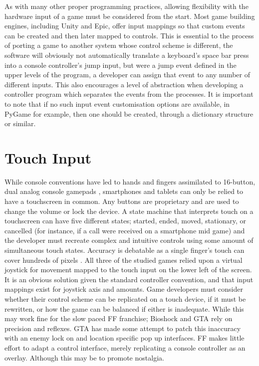 \documentclass{scrartcl}
\begin{document}
As with many other proper programming practices, allowing flexibility with the hardware input of a game must be considered from the start.  Most game building engines, including Unity and Epic, offer input mappings so that custom events can be created and then later mapped to controls.  This is essential 
to the process of porting a game to another system whose control scheme is different, the software will obviously not automatically translate a keyboard's space bar 
press into a console controller's jump input, but were a jump event defined in the upper levels of the program, a developer can assign that event to any number of different inputs.  This also encourages a level of abstraction when developing a controller program which separates the events from the processes.  It is important to note that if no such input event customisation options are available, in PyGame for example, then one should be created, through a dictionary structure or similar.

\section*{Touch Input}

While console conventions have led to hands and fingers assimilated to 16-button, dual analog console gamepads \cite{parisi2015counterrevolution}, smartphones and tablets can only be relied to have a touchscreen in common.  Any buttons are proprietary and are used to change the volume or lock the device.  A state machine that interprets touch on a touchscreen can have five different states; started, ended, moved, stationary, or cancelled (for instance, if a call were received on a smartphone mid game) and the developer must recreate complex and intuitive controls using some amount of simultaneous touch states.  Accuracy is debatable as a single finger's touch can cover hundreds of pixels \cite{schmidt2010phonetouch}.  All three of the studied games relied upon a virtual joystick for movement mapped to the touch input on the lower left of the screen.  It is an obvious solution given the standard controller convention, and that input mappings exist for joystick axis and amounts.  Game developers must consider whether their control scheme can be replicated on a touch device, if it must be rewritten, or how the game can be balanced if either is inadequate.  While this may work fine for the slow paced FF franchise; Bioshock and GTA rely on precision and reflexes.  GTA has made some attempt to patch this inaccuracy with an enemy lock on and location specific pop up interfaces.  FF makes little effort to adapt a control interface, merely replicating a console controller as an overlay.  Although this may be to promote nostalgia.\\
\end{document}

